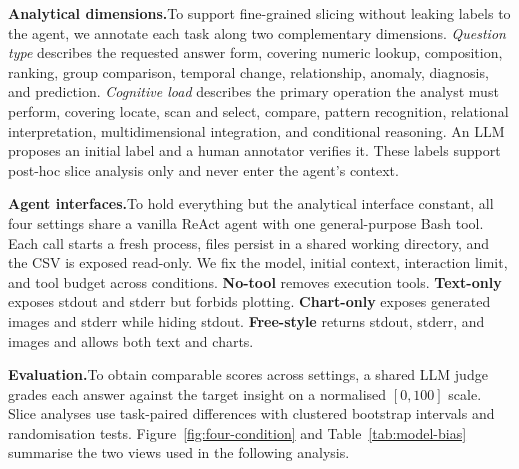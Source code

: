 \documentclass{article}
\newcommand{\stitle}[1]{\noindent\textbf{#1}}
\begin{document}
\stitle{Analytical dimensions.}\quad To support fine-grained slicing without leaking labels to the agent, we annotate each task along two complementary dimensions. \textit{Question type} describes the requested answer form, covering numeric lookup, composition, ranking, group comparison, temporal change, relationship, anomaly, diagnosis, and prediction. \textit{Cognitive load} describes the primary operation the analyst must perform, covering locate, scan and select, compare, pattern recognition, relational interpretation, multidimensional integration, and conditional reasoning. An LLM proposes an initial label and a human annotator verifies it. These labels support post-hoc slice analysis only and never enter the agent's context.

\stitle{Agent interfaces.}\quad To hold everything but the analytical interface constant, all four settings share a vanilla ReAct agent with one general-purpose Bash tool. Each call starts a fresh process, files persist in a shared working directory, and the CSV is exposed read-only. We fix the model, initial context, interaction limit, and tool budget across conditions. \textbf{No-tool} removes execution tools. \textbf{Text-only} exposes stdout and stderr but forbids plotting. \textbf{Chart-only} exposes generated images and stderr while hiding stdout. \textbf{Free-style} returns stdout, stderr, and images and allows both text and charts.

\stitle{Evaluation.}\quad To obtain comparable scores across settings, a shared LLM judge grades each answer against the target insight on a normalised $[0,100]$ scale. Slice analyses use task-paired differences with clustered bootstrap intervals \citep{efron1993bootstrap} and randomisation tests. Figure~\ref{fig:four-condition} and Table~\ref{tab:model-bias} summarise the two views used in the following analysis.
\end{document}
